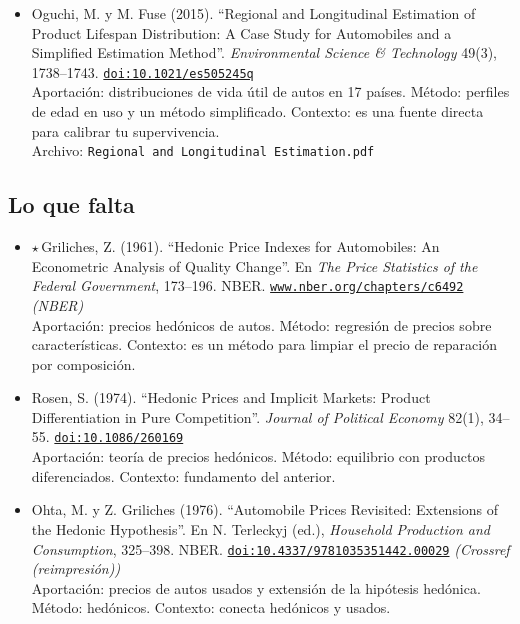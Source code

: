 \documentclass[11pt]{article}
\begin{document}
\begin{itemize}
{\footnotesize Archivo: \texttt{09 New and used auto.pdf}}
\item Oguchi, M. y M. Fuse (2015). ``Regional and Longitudinal Estimation of Product Lifespan Distribution: A Case Study for Automobiles and a Simplified Estimation Method''. \textit{Environmental Science \& Technology} 49(3), 1738--1743. \href{https://doi.org/10.1021/es505245q}{\texttt{doi:10.1021/es505245q}}\\
Aportación: distribuciones de vida útil de autos en 17 países. Método: perfiles de edad en uso y un método simplificado. Contexto: es una fuente directa para calibrar tu supervivencia.\\
{\footnotesize Archivo: \texttt{Regional and Longitudinal Estimation.pdf}}
\end{itemize}

\subsection*{Lo que falta}
\begin{itemize}
\item $\star$\,Griliches, Z. (1961). ``Hedonic Price Indexes for Automobiles: An Econometric Analysis of Quality Change''. En \textit{The Price Statistics of the Federal Government}, 173--196. NBER. \href{https://www.nber.org/chapters/c6492}{\texttt{www.nber.org/chapters/c6492}} \textit{(NBER)}\\
Aportación: precios hedónicos de autos. Método: regresión de precios sobre características. Contexto: es un método para limpiar el precio de reparación por composición.
\item Rosen, S. (1974). ``Hedonic Prices and Implicit Markets: Product Differentiation in Pure Competition''. \textit{Journal of Political Economy} 82(1), 34--55. \href{https://doi.org/10.1086/260169}{\texttt{doi:10.1086/260169}}\\
Aportación: teoría de precios hedónicos. Método: equilibrio con productos diferenciados. Contexto: fundamento del anterior.
\item Ohta, M. y Z. Griliches (1976). ``Automobile Prices Revisited: Extensions of the Hedonic Hypothesis''. En N. Terleckyj (ed.), \textit{Household Production and Consumption}, 325--398. NBER. \href{https://doi.org/10.4337/9781035351442.00029}{\texttt{doi:10.4337/9781035351442.00029}} \textit{(Crossref (reimpresión))}\\
Aportación: precios de autos usados y extensión de la hipótesis hedónica. Método: hedónicos. Contexto: conecta hedónicos y usados.
\end{itemize}
\end{document}
